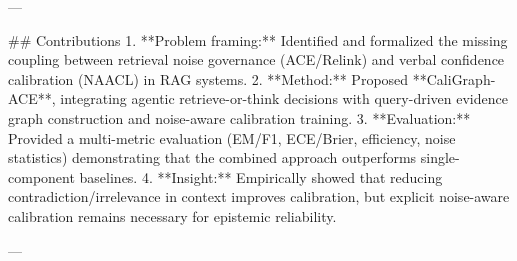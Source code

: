 ---

## Contributions  
1. **Problem framing:** Identified and formalized the missing coupling between retrieval noise governance (ACE/Relink) and verbal confidence calibration (NAACL) in RAG systems.  
2. **Method:** Proposed **CaliGraph-ACE**, integrating agentic retrieve-or-think decisions with query-driven evidence graph construction and noise-aware calibration training.  
3. **Evaluation:** Provided a multi-metric evaluation (EM/F1, ECE/Brier, efficiency, noise statistics) demonstrating that the combined approach outperforms single-component baselines.  
4. **Insight:** Empirically showed that reducing contradiction/irrelevance in context improves calibration, but explicit noise-aware calibration remains necessary for epistemic reliability.

---
